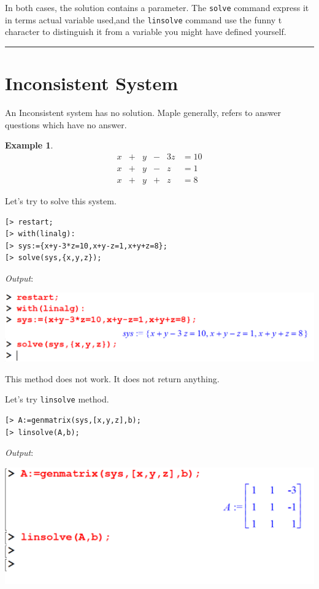 \documentclass[
]{book}
\theoremstyle{definition}
\theoremstyle{definition}
\newtheorem{example}{Example}[chapter]
\theoremstyle{definition}
\theoremstyle{definition}
\theoremstyle{remark}
\begin{document}
In both cases, the solution contains a parameter.
The \texttt{solve} command express it in terms actual variable used,and the \texttt{linsolve} command use the funny t character to distinguish it from a variable you might have defined yourself.

\begin{center}\rule{0.5\linewidth}{0.5pt}\end{center}

\section{Inconsistent System}\label{inconsistent-system}

An Inconsistent system has no solution. Maple generally, refers to answer questions which have no answer.

\begin{example}
\protect\hypertarget{exm:unnamed-chunk-8}{}\label{exm:unnamed-chunk-8}\[
\begin{array}{ccccccccc}
x &+& y &-& 3z &= 10\\
x &+& y &-&  z &= 1\\
x &+& y &+&  z &= 8  
\end{array}
\]
\end{example}

Let's try to solve this system.

\begin{verbatim}
[> restart;
[> with(linalg):
[> sys:={x+y-3*z=10,x+y-z=1,x+y+z=8};
[> solve(sys,{x,y,z});
\end{verbatim}

\emph{Output}:

\includegraphics{figures/Lesson 5/fig11.png}

This method does not work. It does not return anything.

Let's try \texttt{linsolve} method.

\begin{verbatim}
[> A:=genmatrix(sys,[x,y,z],b);
[> linsolve(A,b);
\end{verbatim}

\emph{Output}:

\includegraphics{figures/Lesson 5/fig12.png}
\end{document}
